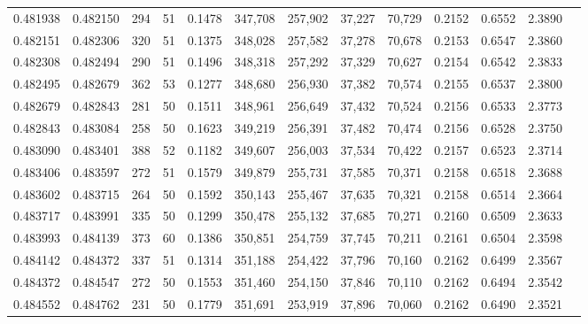 \begin{tabular}{rrrrrrrrrrrrr}
0.481938 & 0.482150 &   294 &  51 &                                     0.1478 & 347,708 & 257,902 &  37,227 &  70,729 & 0.2152 & 0.6552 & 2.3890 \\
0.482151 & 0.482306 &   320 &  51 &                                     0.1375 & 348,028 & 257,582 &  37,278 &  70,678 & 0.2153 & 0.6547 & 2.3860 \\
0.482308 & 0.482494 &   290 &  51 &                                     0.1496 & 348,318 & 257,292 &  37,329 &  70,627 & 0.2154 & 0.6542 & 2.3833 \\
0.482495 & 0.482679 &   362 &  53 &                                     0.1277 & 348,680 & 256,930 &  37,382 &  70,574 & 0.2155 & 0.6537 & 2.3800 \\
0.482679 & 0.482843 &   281 &  50 &                                     0.1511 & 348,961 & 256,649 &  37,432 &  70,524 & 0.2156 & 0.6533 & 2.3773 \\
0.482843 & 0.483084 &   258 &  50 &                                     0.1623 & 349,219 & 256,391 &  37,482 &  70,474 & 0.2156 & 0.6528 & 2.3750 \\
0.483090 & 0.483401 &   388 &  52 &                                     0.1182 & 349,607 & 256,003 &  37,534 &  70,422 & 0.2157 & 0.6523 & 2.3714 \\
0.483406 & 0.483597 &   272 &  51 &                                     0.1579 & 349,879 & 255,731 &  37,585 &  70,371 & 0.2158 & 0.6518 & 2.3688 \\
0.483602 & 0.483715 &   264 &  50 &                                     0.1592 & 350,143 & 255,467 &  37,635 &  70,321 & 0.2158 & 0.6514 & 2.3664 \\
0.483717 & 0.483991 &   335 &  50 &                                     0.1299 & 350,478 & 255,132 &  37,685 &  70,271 & 0.2160 & 0.6509 & 2.3633 \\
0.483993 & 0.484139 &   373 &  60 &                                     0.1386 & 350,851 & 254,759 &  37,745 &  70,211 & 0.2161 & 0.6504 & 2.3598 \\
0.484142 & 0.484372 &   337 &  51 &                                     0.1314 & 351,188 & 254,422 &  37,796 &  70,160 & 0.2162 & 0.6499 & 2.3567 \\
0.484372 & 0.484547 &   272 &  50 &                                     0.1553 & 351,460 & 254,150 &  37,846 &  70,110 & 0.2162 & 0.6494 & 2.3542 \\
0.484552 & 0.484762 &   231 &  50 &                                     0.1779 & 351,691 & 253,919 &  37,896 &  70,060 & 0.2162 & 0.6490 & 2.3521 \\

\end{tabular}
